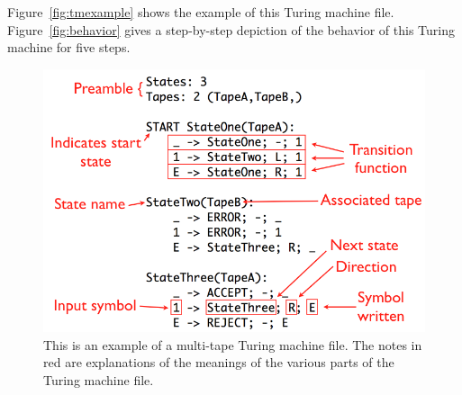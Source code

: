 \documentclass[11pt]{report}
\begin{document}
Figure~\ref{fig:tmexample} shows the example of this Turing machine file. Figure~\ref{fig:behavior} gives a step-by-step depiction of the behavior of this Turing machine for five steps. \\

\begin{figure} 
\begin{center} 
\includegraphics[scale=0.4]{figs/annotatedtm.png} 
\caption{This is an example of a multi-tape Turing machine file. The notes in red are explanations of the meanings of the various parts of the Turing machine file. \label{fig:example}} 
\end{center} 
\end{figure}
\end{document}
